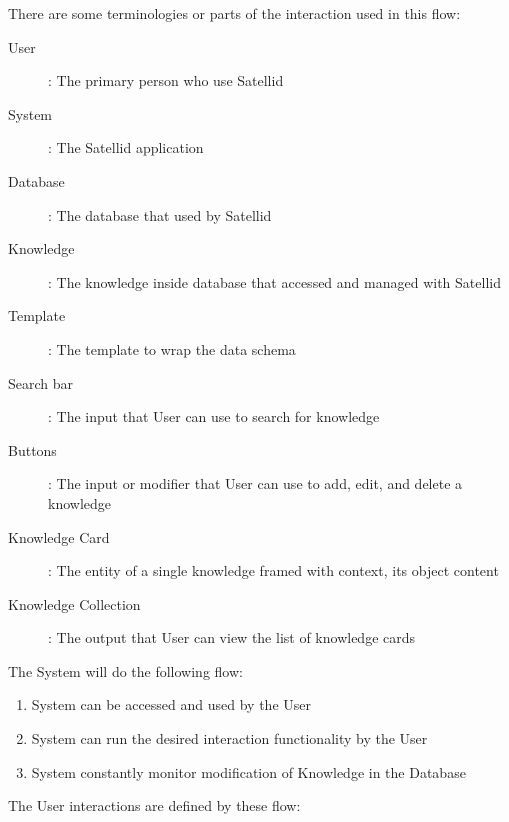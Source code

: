 \noindent There are some terminologies or parts of the interaction used in this flow:
\vspace{-10pt}

\begin{description}
\item [User]: The primary person who use Satellid
\item [System]: The Satellid application
\item [Database]: The database that used by Satellid
\item [Knowledge]: The knowledge inside database that accessed and managed with Satellid
\item [Template]: The template to wrap the data schema
\item [Search bar]: The input that User can use to search for knowledge
\item [Buttons]: The input or modifier that User can use to add, edit, and delete a knowledge
\item [Knowledge Card]: The entity of a single knowledge framed with context, its object content
\item [Knowledge Collection]: The output that User can view the list of knowledge cards
\end{description}

\noindent The System will do the following flow:

\begin{enumerate}
\item System can be accessed and used by the User
\item System can run the desired interaction functionality by the User
\item System constantly monitor modification of Knowledge in the Database
\end{enumerate}

\noindent The User interactions are defined by these flow:

